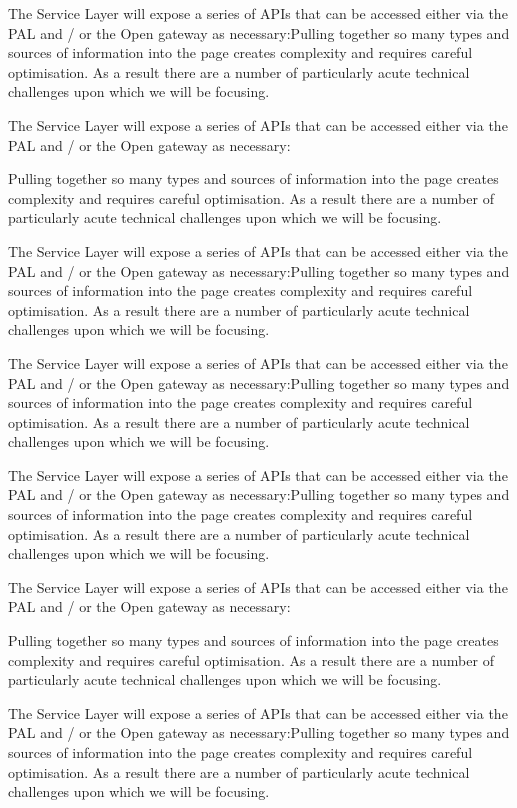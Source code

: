 \documentclass[12pt, a4paper, parskip=half,
               enlargefirstpage, pagenumber=no]{scrlttr2}
\begin{document}
The Service Layer will expose a series of APIs that can be accessed either via the PAL and / or the Open gateway as necessary:Pulling together so many types and sources of information into the page creates complexity and requires careful optimisation. As a result there are a number of particularly acute technical challenges upon which we will be focusing.

The Service Layer will expose a series of APIs that can be accessed either via the PAL and / or the Open gateway as necessary:

Pulling together so many types and sources of information into the page creates complexity and requires careful optimisation. As a result there are a number of particularly acute technical challenges upon which we will be focusing.

The Service Layer will expose a series of APIs that can be accessed either via the PAL and / or the Open gateway as necessary:Pulling together so many types and sources of information into the page creates complexity and requires careful optimisation. As a result there are a number of particularly acute technical challenges upon which we will be focusing.

The Service Layer will expose a series of APIs that can be accessed either via the PAL and / or the Open gateway as necessary:Pulling together so many types and sources of information into the page creates complexity and requires careful optimisation. As a result there are a number of particularly acute technical challenges upon which we will be focusing.

The Service Layer will expose a series of APIs that can be accessed either via the PAL and / or the Open gateway as necessary:Pulling together so many types and sources of information into the page creates complexity and requires careful optimisation. As a result there are a number of particularly acute technical challenges upon which we will be focusing.

The Service Layer will expose a series of APIs that can be accessed either via the PAL and / or the Open gateway as necessary:

Pulling together so many types and sources of information into the page creates complexity and requires careful optimisation. As a result there are a number of particularly acute technical challenges upon which we will be focusing.

The Service Layer will expose a series of APIs that can be accessed either via the PAL and / or the Open gateway as necessary:Pulling together so many types and sources of information into the page creates complexity and requires careful optimisation. As a result there are a number of particularly acute technical challenges upon which we will be focusing.
\end{document}
